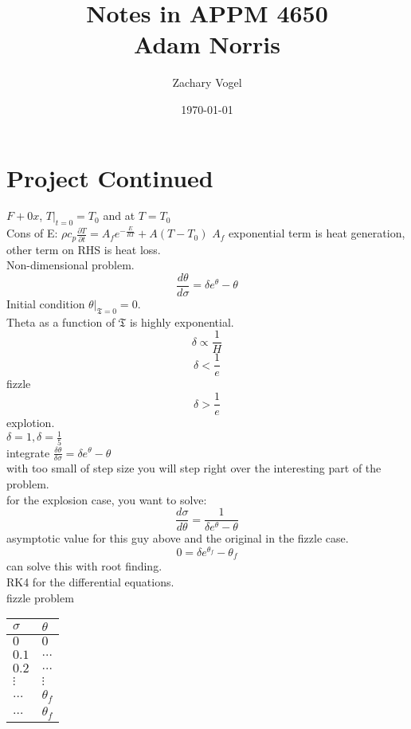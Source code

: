 \documentclass{article}
\begin{document}
\author{Zachary Vogel}
\date{\today}
\title{Notes in APPM 4650\\Adam Norris}

\maketitle

\section{Project Continued}
$F+0x$, $T\bigg|_{t=0}=T_0$ and at $T=T_0$\\
Cons of E: $\rho c_p\frac{\partial T}{\partial t}=A_fe^{-\frac{E}{RT}}+A(T-T_0)$
$A_f$ exponential term is heat generation, other term on RHS is heat loss.\\
Non-dimensional problem.\\
\[\frac{d\theta}{d\sigma}=\delta e^{\theta}-\theta\]
Initial condition $\theta\bigg|_{\mathfrak{T}=0}=0$.\\
Theta as a function of $\mathfrak{T}$ is highly exponential.\\
\[\delta\propto \frac{1}{H}\]
\[\delta<\frac{1}{e}\]
fizzle
\[\delta>\frac{1}{e}\]
explotion.\\

$\delta=1, \delta=\frac{1}{5}$\\
integrate $\frac{\delta \theta}{\delta \sigma}=\delta e^{\theta}-\theta$\\
with too small of step size you will step right over the interesting part of the problem.\\
for the explosion case, you want to solve:
\[\frac{d\sigma}{d\theta}=\frac{1}{\delta e^{\theta}-\theta}\]
asymptotic value for this guy above and the original in the fizzle case.\\
\[0=\delta e^{\theta_f}-\theta_f\]
can solve this with root finding.\\

RK4 for the differential equations.\\
fizzle problem
\begin{table}[h!]
    \centering
    \begin{tabular}{l|l}
        $\sigma$ & $\theta$\\ \hline
        $0$ & $0$\\
        $0.1$ & $\dots$\\
        $0.2$ & $\dots$\\
        $\vdots$ & $\vdots$\\
        $\dots$ & $\theta_f$\\
        $\dots$ & $\theta_f$
    \end{tabular}
\end{table}
\end{document}
